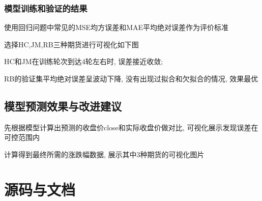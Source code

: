 \documentclass[a4paper,12pt]{ctexart}
\begin{document}
\subsubsection{模型训练和验证的结果}
使用回归问题中常见的MSE均方误差和MAE平均绝对误差作为评价标准

选择HC,JM,RB三种期货进行可视化如下图

HC和JM在训练轮次到达4轮左右时, 误差接近收敛;

RB的验证集平均绝对误差呈波动下降, 没有出现过拟合和欠拟合的情况, 效果最优






\newpage
\subsection{模型预测效果与改进建议}
先根据模型计算出预测的收盘价close和实际收盘价做对比, 可视化展示发现误差在可控范围内

计算得到最终所需的涨跌幅数据, 展示其中3种期货的可视化图片

\newpage
\section{源码与文档}
\end{document}
